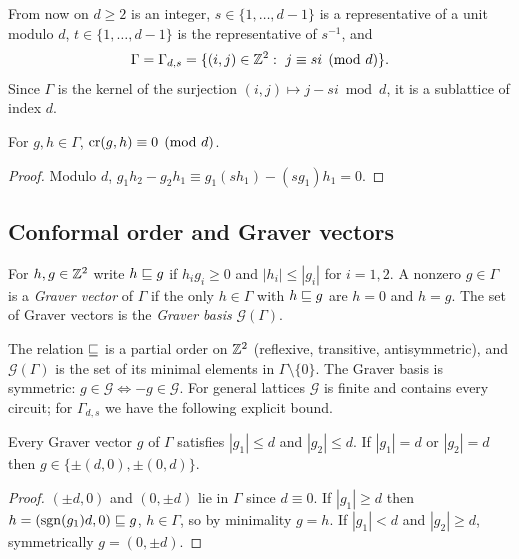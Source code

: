 From now on $d\ge2$ is an integer, $s\in\{1,\dots,d-1\}$ is a representative of a unit modulo $d$, $t\in\{1,\dots,d-1\}$ is the representative of $s^{-1}$, and
\[
  \Gamma=\Gamma_{d,s}=\{(i,j)\in\Z^2:\ j\equiv si\pmod d\}.
\]
Since $\Gamma$ is the kernel of the surjection $(i,j)\mapsto j-si\bmod d$, it is a sublattice of index $d$.

\begin{lemma}[Determinants]\label{lem:det}
For $g,h\in\Gamma$, $\operatorname{cr}(g,h)\equiv0\pmod d$.
\end{lemma}
\begin{proof}
Modulo $d$, $g_1h_2-g_2h_1\equiv g_1(sh_1)-(sg_1)h_1=0$.
\end{proof}

\subsection{Conformal order and Graver vectors}

\begin{definition}\label{def:conformal}
For $h,g\in\mathbb Z^2$ write $h\sqsubseteq g$ if $h_ig_i\ge0$ and $|h_i|\le|g_i|$ for $i=1,2$. A nonzero $g\in\Gamma$ is a \emph{Graver vector} of $\Gamma$ if the only $h\in\Gamma$ with $h\sqsubseteq g$ are $h=0$ and $h=g$. The set of Graver vectors is the \emph{Graver basis} $\mathcal G(\Gamma)$.
\end{definition}

The relation $\sqsubseteq$ is a partial order on $\mathbb Z^2$ (reflexive, transitive, antisymmetric), and $\mathcal G(\Gamma)$ is the set of its minimal elements in $\Gamma\setminus\{0\}$. The Graver basis is symmetric: $g\in\mathcal G\iff-g\in\mathcal G$. For general lattices $\mathcal G$ is finite and contains every circuit; for $\Gamma_{d,s}$ we have the following explicit bound.

\begin{lemma}\label{lem:graver-size}
Every Graver vector $g$ of $\Gamma$ satisfies $|g_1|\le d$ and $|g_2|\le d$. If $|g_1|=d$ or $|g_2|=d$ then $g\in\{\pm(d,0),\pm(0,d)\}$.
\end{lemma}
\begin{proof}
$(\pm d,0)$ and $(0,\pm d)$ lie in $\Gamma$ since $d\equiv0$. If $|g_1|\ge d$ then $h=(\mathrm{sgn}(g_1)d,0)\sqsubseteq g$, $h\in\Gamma$, so by minimality $g=h$. If $|g_1|<d$ and $|g_2|\ge d$, symmetrically $g=(0,\pm d)$.
\end{proof}

